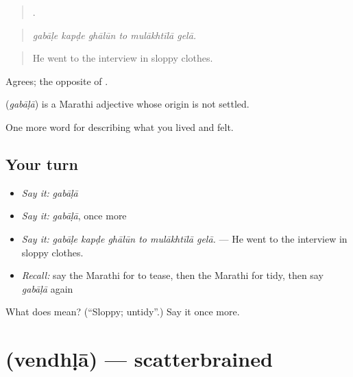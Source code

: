 \begin{quote}
     .
\end{quote}

\begin{quote}
\emph{gabāḷe kapḍe ghālūn to mulākhtīlā gelā.}
\end{quote}

\begin{quote}
He went to the interview in sloppy clothes.
\end{quote}

Agrees; the opposite of .

\begin{cousinweb}
\textbf{} (\emph{gabāḷā}) is a Marathi adjective whose origin is not settled.
\end{cousinweb}

\begin{grammarlens}[title={What you've built}]
One more word for describing what you lived and felt.
\end{grammarlens}

\subsection*{Your turn}
\begin{itemize}
\raggedright
  \item \emph{Say it:} \emph{gabāḷā}
  \item \emph{Say it:} \emph{gabāḷā}, once more
  \item \emph{Say it:} \emph{gabāḷe kapḍe ghālūn to mulākhtīlā gelā.} — He went to the interview in sloppy clothes.
  \item \emph{Recall:} say the Marathi for to tease, then the Marathi for tidy, then say \emph{gabāḷā} again
\end{itemize}

\begin{tcolorbox}[breakable,colback=teal!4,colframe=teal!35!black,title={Before you move on}]
What does  mean? (\textquotedblleft{}Sloppy; untidy\textquotedblright{}.) Say it once more.
\end{tcolorbox}
\section[\texorpdfstring{\mr{वेंधळा} (vendhḷā)}{वेंधळा (vendhḷā)}]{ (vendhḷā) — scatterbrained}

\label{lesson:MR-C474-vendhla}



